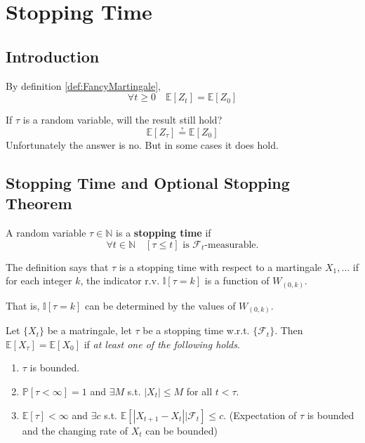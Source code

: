 \section{Stopping Time}
    \subsection{Introduction}
        By definition \ref{def:FancyMartingale},
        \[ \forall t \ge 0 \quad \mathbb{E}[Z_t] = \mathbb{E}[Z_0] \]

        If $\tau$ is a random variable, will the result still hold?
        \[\mathbb{E}[Z_{\tau}] \questeq \mathbb{E}[Z_0]\]
        Unfortunately the answer is no. But in some cases it does hold.

    \subsection{Stopping Time and Optional Stopping Theorem}
        \begin{definition}\label{def:StoppingTime}
            A random variable $\tau \in \mathbb{N}$ is a \textbf{stopping time} if
            \[ \forall t \in \mathbb{N} \quad [\tau \le t] \text{ is $\mathcal{F}_t$-measurable.} \]
        \end{definition}
        \begin{remark}
            The definition says that $\tau$ is a stopping time with respect to a martingale $X_1,\dots$ if for each integer $k$, the indicator r.v. $\mathbb{I}[\tau = k]$ is a function of $W_{(0,k)}$.

            That is, $\mathbb{I}[\tau = k]$ can be determined by the values of $W_{(0,k)}$.
        \end{remark}

        \begin{theorem}\label{thm:OptionalStoppingTheorem}
            Let $\{X_t\}$ be a matringale, let $\tau$ be a stopping time w.r.t. $\{\mathcal{F}_t\}$. Then $\mathbb{E}[X_{\tau}] = \mathbb{E}[X_0]$ if \emph{at least one of the following holds}.
            \begin{enumerate}
                \item $\tau$ is bounded.
                \item $\mathbb{P}[\tau < \infty] = 1$ and $\exists M$ s.t. $|X_t| \le M$ for all $t < \tau$.
                \item $\mathbb{E}[\tau] < \infty$ and $\exists c$ s.t. $\mathbb{E}[|X_{t+1} - X_{t}||\mathcal{F}_t] \le c$. (Expectation of $\tau$ is bounded and the changing rate of $X_t$ can be bounded)
            \end{enumerate}
        \end{theorem}

